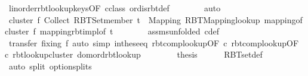 \begin{isabellebody}
\ linorder{\isachardot}{\kern0pt}rbt{\isacharunderscore}{\kern0pt}lookup{\isacharunderscore}{\kern0pt}keys{\isacharbrackleft}{\kern0pt}OF\ c{\isacharprime}{\kern0pt}{\isacharunderscore}{\kern0pt}class{\isacharbrackright}{\kern0pt}\ ord{\isachardot}{\kern0pt}is{\isacharunderscore}{\kern0pt}rbt{\isacharunderscore}{\kern0pt}def\isanewline
\ \ \ \ \ \ \isamarkupfalse%
\ auto\isanewline
\ \ \ \ \isamarkupfalse%
\ {\isachardoublequoteopen}cluster\ f\ {\isacharparenleft}{\kern0pt}Collect\ {\isacharparenleft}{\kern0pt}RBT{\isacharunderscore}{\kern0pt}Set{}{\isachardot}{\kern0pt}member\ t{\isacharparenright}{\kern0pt}{\isacharparenright}{\kern0pt}\ {\isacharequal}{\kern0pt}\ Mapping\ {\isacharparenleft}{\kern0pt}RBT{\isacharunderscore}{\kern0pt}Mapping{}{\isachardot}{\kern0pt}lookup\ {\isacharparenleft}{\kern0pt}mapping{\isacharunderscore}{\kern0pt}of{\isacharunderscore}{\kern0pt}cluster\ f\ {\isacharparenleft}{\kern0pt}mapping{\isacharunderscore}{\kern0pt}rbt{\isachardot}{\kern0pt}impl{\isacharunderscore}{\kern0pt}of\ t{\isacharparenright}{\kern0pt}{\isacharparenright}{\kern0pt}{\isacharparenright}{\kern0pt}{\isachardoublequoteclose}\isanewline
\ \ \ \ \ \ \isamarkupfalse%
\ assms{\isacharparenleft}{\kern0pt}{}{\isacharparenright}{\kern0pt}{\isacharbrackleft}{\kern0pt}unfolded\ c{\isacharprime}{\kern0pt}{\isacharunderscore}{\kern0pt}def{\isacharbrackright}{\kern0pt}\isanewline
\ \ \ \ \ \ \isamarkupfalse%
\ {\isacharparenleft}{\kern0pt}transfer\ fixing{\isacharcolon}{\kern0pt}\ f{\isacharparenright}{\kern0pt}\ {\isacharparenleft}{\kern0pt}auto\ simp{\isacharcolon}{\kern0pt}\ in{\isacharunderscore}{\kern0pt}these{\isacharunderscore}{\kern0pt}eq\ rbt{\isacharunderscore}{\kern0pt}comp{\isacharunderscore}{\kern0pt}lookup{\isacharbrackleft}{\kern0pt}OF\ c{\isacharbrackright}{\kern0pt}\ rbt{\isacharunderscore}{\kern0pt}comp{\isacharunderscore}{\kern0pt}lookup{\isacharbrackleft}{\kern0pt}OF\ c{\isacharprime}{\kern0pt}{\isacharbrackright}{\kern0pt}\ rbt{\isacharunderscore}{\kern0pt}lookup{\isacharunderscore}{\kern0pt}cluster\ dom{\isacharunderscore}{\kern0pt}ord{\isacharunderscore}{\kern0pt}rbt{\isacharunderscore}{\kern0pt}lookup{\isacharparenright}{\kern0pt}\isanewline
\ \ \isacommand{{\isacharbraceright}{\kern0pt}}\isamarkupfalse%
\isanewline
\ \ \isamarkupfalse%
\ \isamarkupfalse%
\ {\isacharquery}{\kern0pt}thesis\isanewline
\ \ \ \ \isamarkupfalse%
\ RBT{\isacharunderscore}{\kern0pt}set{\isacharunderscore}{\kern0pt}def\isanewline
\ \ \ \ \isamarkupfalse%
\ {\isacharparenleft}{\kern0pt}auto\ split{\isacharcolon}{\kern0pt}\ option{\isachardot}{\kern0pt}splits{\isacharparenright}{\kern0pt}\isanewline
{}\isamarkupfalse%
%
\endisatagproof
{\isafoldproof}%
%
\isadelimproof
\isanewline
%
\endisadelimproof
%
\isadelimtheory
\isanewline
%
\endisadelimtheory
%
\isatagtheory
{}\isamarkupfalse%
%
\endisatagtheory
{\isafoldtheory}%
%
\isadelimtheory
%
\endisadelimtheory
%
\end{isabellebody}%
